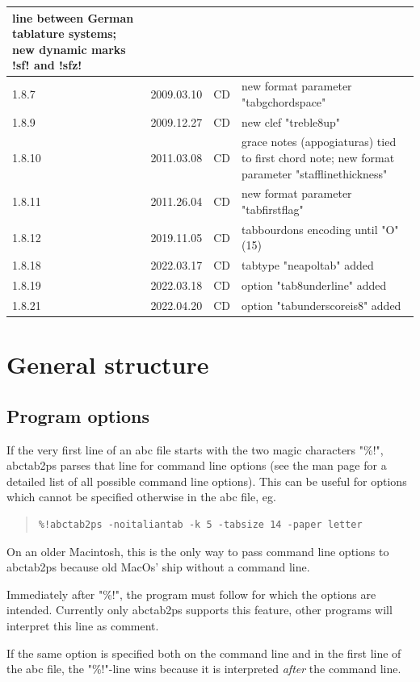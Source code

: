 \documentclass[a4paper]{article}
\begin{document}
\begin{center}
\begin{longtable}{|l|l|l|p{8cm}|}
    line between German tablature systems; new dynamic marks !sf! and !sfz!
    \\ \hline
1.8.7 & 2009.03.10 & CD & new format parameter "tabgchordspace" \\ \hline
1.8.9 & 2009.12.27 & CD & new clef "treble8up" \\ \hline
1.8.10 & 2011.03.08 & CD & grace notes (appogiaturas) tied to first chord note;
    new format parameter "stafflinethickness" \\ \hline
1.8.11 & 2011.26.04 & CD & new format parameter "tabfirstflag"
    \\ \hline
1.8.12 & 2019.11.05 & CD & tabbourdons encoding until "O" (15)
    \\ \hline
1.8.18 & 2022.03.17 & CD & tabtype "neapoltab" added
    \\ \hline
1.8.19 & 2022.03.18 & CD & option "tab8underline" added
    \\ \hline
1.8.21 & 2022.04.20 & CD & option "tabunderscoreis8" added
    \\ \hline
\end{longtable}
\end{center}

\section{General structure}

\subsection{Program options}
If the very first line of an abc file starts with the two magic 
characters "\%!", abctab2ps parses that line for command
line options (see the man page for a detailed list of all possible 
command line options). This can be useful for options which cannot
be specified otherwise in the abc file, eg.

\begin{quote}
\begin{verbatim}
%!abctab2ps -noitaliantab -k 5 -tabsize 14 -paper letter
\end{verbatim}
\end{quote}

On an older Macintosh, this is the only way to pass command line options
to abctab2ps because old MacOs' ship without a command line.
\par
Immediately after "\%!", the program must follow for which the 
options are intended. Currently only abctab2ps supports this
feature, other programs will interpret this line as comment.
\par
If the same option is specified both on the command line and
in the first line of the abc file, the "\%!"-line wins because
it is interpreted {\it after} the command line.
\end{document}
